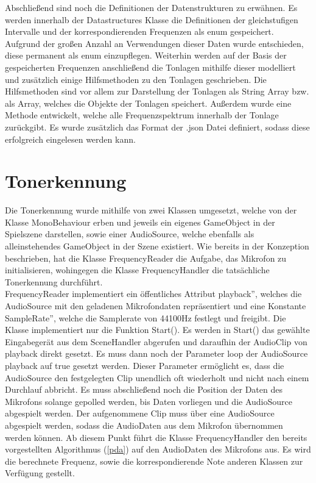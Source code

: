 Abschließend sind noch die Definitionen der Datenstrukturen zu erwähnen. Es werden innerhalb der Datastructures Klasse die Definitionen der gleichstufigen Intervalle und der korrespondierenden Frequenzen als enum gespeichert. Aufgrund der großen Anzahl an Verwendungen dieser Daten wurde entschieden, diese permanent als enum einzupflegen. Weiterhin werden auf der Basis der gespeicherten Frequenzen anschließend die Tonlagen mithilfe dieser modelliert und zusätzlich einige Hilfsmethoden zu den Tonlagen geschrieben. Die Hilfsmethoden sind vor allem zur Darstellung der Tonlagen als String Array bzw. als Array, welches die Objekte der Tonlagen speichert. Außerdem wurde eine Methode entwickelt, welche alle Frequenzspektrum innerhalb der Tonlage zurückgibt. Es wurde zusätzlich das Format der .json Datei definiert, sodass diese erfolgreich eingelesen werden kann. 

\section{Tonerkennung}
\label{sec:tonerkennung}
Die Tonerkennung wurde mithilfe von zwei Klassen umgesetzt, welche von der Klasse MonoBehaviour erben und jeweils ein eigenes GameObject in der Spielszene darstellen, sowie einer AudioSource, welche ebenfalls als alleinstehendes GameObject in der Szene existiert. Wie bereits in der Konzeption beschrieben, hat die Klasse FrequencyReader die Aufgabe, das Mikrofon zu initialisieren, wohingegen die Klasse FrequencyHandler die tatsächliche Tonerkennung durchführt. \\
FrequencyReader implementiert ein öffentliches Attribut \glqq playback'', welches die AudioSource mit den geladenen Mikrofondaten repräsentiert und eine Konstante \glqq SampleRate'', welche die Samplerate von 44100Hz festlegt und freigibt. Die Klasse implementiert nur die Funktion Start(). Es werden in Start() das gewählte Eingabegerät aus dem SceneHandler abgerufen und daraufhin der AudioClip von playback direkt gesetzt. Es muss dann noch der Parameter loop der AudioSource playback auf true gesetzt werden. Dieser Parameter ermöglicht es, dass die AudioSource den festgelegten Clip unendlich oft wiederholt und nicht nach einem Durchlauf abbricht. Es muss abschließend noch die Position der Daten des Mikrofons solange gepolled werden, bis Daten vorliegen und die AudioSource abgespielt werden. Der aufgenommene Clip muss über eine AudioSource abgespielt werden, sodass die AudioDaten aus dem Mikrofon übernommen werden können. Ab diesem Punkt führt die Klasse FrequencyHandler den bereits vorgestellten Algorithmus (\ref{pda}) auf den AudioDaten des Mikrofons aus. Es wird die berechnete Frequenz, sowie die korrespondierende Note anderen Klassen zur Verfügung gestellt. 

